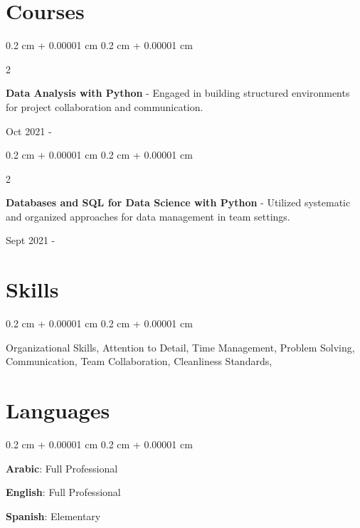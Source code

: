 \documentclass[10pt, letterpaper]{article}
\newenvironment{onecolentry}{
\begin{adjustwidth}{
0.2 cm + 0.00001 cm
}{
0.2 cm + 0.00001 cm
}
}{
\end{adjustwidth}
} %
\newenvironment{twocolentry}[2][]{
\onecolentry
\def\secondColumn{#2}
\setcolumnwidth{\fill, 4.5 cm}
\begin{paracol}{2}
}{
\switchcolumn \raggedleft \secondColumn
\end{paracol}
\endonecolentry
} %
\begin{document}
\section{Courses}

\begin{twocolentry}{Oct 2021 - }
\textbf{Data Analysis with Python} - \textit{}  
\newline 
\newline Engaged in building structured environments for project collaboration and communication.

\end{twocolentry}
\tightdivider

\begin{twocolentry}{Sept 2021 - }
\textbf{Databases and SQL for Data Science with Python} - \textit{}  
\newline 
\newline Utilized systematic and organized approaches for data management in team settings.

\end{twocolentry}
\medskip

\section{Skills}
\begin{onecolentry}

{Organizational Skills}, 
{Attention to Detail}, 
{Time Management}, 
{Problem Solving}, 
{Communication}, 
{Team Collaboration}, 
{Cleanliness Standards}, 
\end{onecolentry}

\section{Languages}
\begin{onecolentry}

\textbf{Arabic}: Full Professional

\textbf{English}: Full Professional

\textbf{Spanish}: Elementary

\end{onecolentry}
\end{document}
